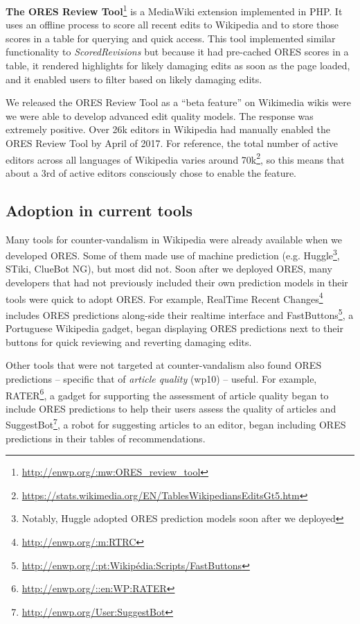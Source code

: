 \textbf{The ORES Review Tool}\footnote{\url{http://enwp.org/:mw:ORES_review_tool}} is a MediaWiki extension implemented in PHP.  It uses an offline process to score all recent edits to Wikipedia and to store those scores in a table for querying and quick access.  This tool implemented similar functionality to \emph{ScoredRevisions} but because it had pre-cached ORES scores in a table, it rendered highlights for likely damaging edits as soon as the page loaded, and it enabled users to filter based on likely damaging edits.

We released the ORES Review Tool as a ``beta feature'' on Wikimedia wikis were we were able to develop advanced edit quality models.  The response was extremely positive.  Over 26k editors in Wikipedia had manually enabled the ORES Review Tool by April of 2017.  For reference, the total number of active editors across all languages of Wikipedia varies around 70k\footnote{\url{https://stats.wikimedia.org/EN/TablesWikipediansEditsGt5.htm}}, so this means that about a 3rd of active editors consciously chose to enable the feature.

\subsection{Adoption in current tools}
Many tools for counter-vandalism in Wikipedia were already available when we developed ORES.  Some of them made use of machine prediction (e.g. Huggle\footnote{Notably, Huggle adopted ORES prediction models soon after we deployed}, STiki, ClueBot NG), but most did not.  Soon after we deployed ORES, many developers that had not previously included their own prediction models in their tools were quick to adopt ORES.  For example, RealTime Recent Changes\footnote{\url{http://enwp.org/:m:RTRC}} includes ORES predictions along-side their realtime interface and FastButtons\footnote{\url{http://enwp.org/:pt:Wikipédia:Scripts/FastButtons}}, a Portuguese Wikipedia gadget, began displaying ORES predictions next to their buttons for quick reviewing and reverting damaging edits.

Other tools that were not targeted at counter-vandalism also found ORES predictions -- specific that of \emph{article quality} (wp10) -- useful.  For example, RATER\footnote{\url{http://enwp.org/::en:WP:RATER}}, a gadget for supporting the assessment of article quality began to include ORES predictions to help their users assess the quality of articles and SuggestBot\footnote{\url{http://enwp.org/User:SuggestBot}}\cite{cosley2007suggestbot}, a robot for suggesting articles to an editor, began including ORES predictions in their tables of recommendations.

